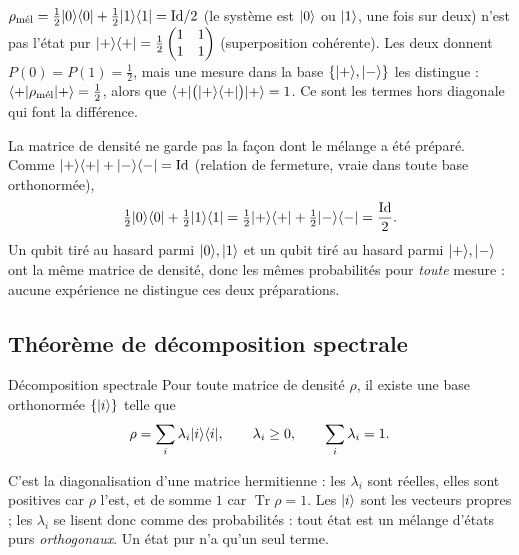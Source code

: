 \begin{remarque}
$\rho_{\text{mél}}=\frac12|0\rangle\langle 0|+\frac12|1\rangle\langle 1|=\mathrm{Id}/2$ (le système
est $|0\rangle$ ou $|1\rangle$, une fois sur deux) n'est pas l'état pur
$|+\rangle\langle +|=\frac12\begin{pmatrix}1 & 1\\ 1 & 1\end{pmatrix}$ (superposition
cohérente). Les deux donnent $P(0)=P(1)=\frac12$, mais une mesure dans la base
$\{|+\rangle,|-\rangle\}$ les distingue : $\langle +|\rho_{\text{mél}}|+\rangle=\frac12$, alors que
$\langle +|\big(|+\rangle\langle +|\big)|+\rangle=1$. Ce sont les termes hors diagonale qui font la
différence.
\end{remarque}

\begin{remarque}\label{rem:ensembles}
La matrice de densité ne garde pas la façon dont le mélange a été préparé. Comme
$|+\rangle\langle +|+|-\rangle\langle -|=\mathrm{Id}$ (relation de fermeture, vraie dans toute base orthonormée),
\[
  \tfrac12|0\rangle\langle 0|+\tfrac12|1\rangle\langle 1|
  =\tfrac12|+\rangle\langle +|+\tfrac12|-\rangle\langle -|=\frac{\mathrm{Id}}{2}.
\]
Un qubit tiré au hasard parmi $|0\rangle,|1\rangle$ et un qubit tiré au hasard parmi $|+\rangle,|-\rangle$ ont
la même matrice de densité, donc les mêmes probabilités pour \emph{toute} mesure : aucune expérience
ne distingue ces deux préparations.
\end{remarque}

\subsection{Théorème de décomposition spectrale}\label{sec:spectral}

\begin{resultat}{Décomposition spectrale}
Pour toute matrice de densité $\rho$, il existe une base orthonormée $\{|i\rangle\}$ telle que
\[
  \rho=\sum_i\lambda_i|i\rangle\langle i|,
  \qquad\lambda_i\geq0,\qquad\sum_i\lambda_i=1 .
\]
\end{resultat}

C'est la diagonalisation d'une matrice hermitienne : les $\lambda_i$ sont réelles, elles
sont positives car $\rho$ l'est, et de somme $1$ car $\operatorname{Tr}\rho=1$. Les
$|i\rangle$ sont les vecteurs propres ; les $\lambda_i$ se lisent donc comme des
probabilités : tout état est un mélange d'états purs \emph{orthogonaux}. Un état pur n'a
qu'un seul terme.

